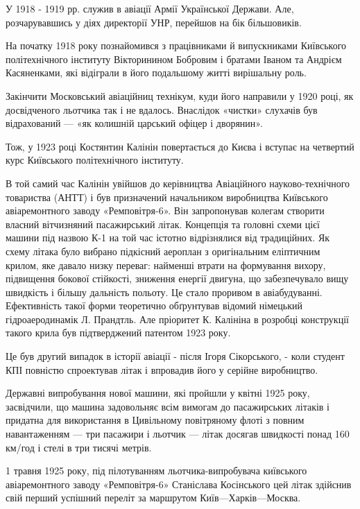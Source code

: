 У 1918 - 1919 рр. служив в авіації Армії Української Держави. Але,
розчарувавшись у діях директорії УНР, перейшов на бік більшовиків. 

На початку 1918 року познайомився з працівниками й випускниками Київського
політехнічного інституту Вікторинином Бобровим і братами Іваном та Андрієм
Касяненками, які відіграли в його подальшому житті вирішальну роль.


Закінчити Московський авіаційниц технікум, куди його направили у 1920 році, як
досвідченого льотчика так і не вдалось.  Внаслідок «чистки» слухачів був
відрахований — «як колишній царський офіцер і дворянин».

Тож, у 1923 році Костянтин Калінін повертається до Києва і вступає на четвертий
курс Київського політехнічного інституту.

В той самий час Калінін увійшов до керівництва Авіаційного науково-технічного
товариства (АНТТ) і був призначений начальником виробництва Київського
авіаремонтного заводу «Ремповітря-6». Він запропонував колегам створити власний
вітчизняний пасажирський літак. Концепція та головні схеми цієї машини під
назвою К-1 на той час істотно відрізнялися від традиційних. Як схему літака
було вибрано підкісний аероплан з оригінальним еліптичним крилом, яке давало
низку переваг: найменші втрати на формування вихору, підвищення бокової
стійкості, зниження енергії двигуна, що забезпечувало вищу швидкість і більшу
дальність польоту. Це стало проривом в авіабудуванні. Ефективність такої форми
теоретично обґрунтував відомий німецький гідроаеродинамік Л. Прандтль. Але
пріоритет К. Калініна в розробці конструкції такого крила був підтверджений
патентом 1923 року.

Це був другий випадок в історії авіації - після Ігоря Сікорського, - коли
студент КПІ повністю спроектував літак і впровадив його у серійне виробництво.

Державні випробування нової машини, які пройшли у квітні 1925 року, засвідчили,
що машина задовольняє всім вимогам до пасажирських літаків і придатна для
використання в Цивільному повітряному флоті з повним навантаженням — три
пасажири і льотчик — літак досягав швидкості понад 160 км/год і стелі в три
тисячі метрів.

1 травня 1925 року, під пілотуванням льотчика-випробувача київського
авіаремонтного заводу «Ремповітря-6» Станіслава Косінського цей літак здійснив
свій перший успішний переліт за маршрутом Київ—Харків—Москва.

